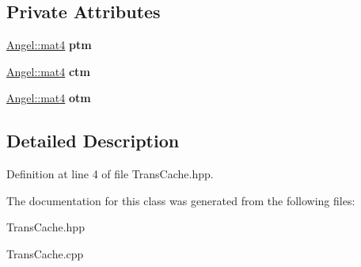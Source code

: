 \subsection*{Private Attributes}
\begin{DoxyCompactItemize}
\item 
\hypertarget{class_trans_cache_af0652a8016db75eea63d9486ca1959ad}{\hyperlink{class_angel_1_1mat4}{Angel\-::mat4} {\bfseries ptm}}\label{class_trans_cache_af0652a8016db75eea63d9486ca1959ad}

\item 
\hypertarget{class_trans_cache_add771d1088642aca16cea5df82c1b6b0}{\hyperlink{class_angel_1_1mat4}{Angel\-::mat4} {\bfseries ctm}}\label{class_trans_cache_add771d1088642aca16cea5df82c1b6b0}

\item 
\hypertarget{class_trans_cache_afcebdcb61bebb8d44d40fa2d19d7009d}{\hyperlink{class_angel_1_1mat4}{Angel\-::mat4} {\bfseries otm}}\label{class_trans_cache_afcebdcb61bebb8d44d40fa2d19d7009d}

\end{DoxyCompactItemize}


\subsection{Detailed Description}


Definition at line 4 of file Trans\-Cache.\-hpp.



The documentation for this class was generated from the following files\-:\begin{DoxyCompactItemize}
\item 
Trans\-Cache.\-hpp\item 
Trans\-Cache.\-cpp\end{DoxyCompactItemize}
